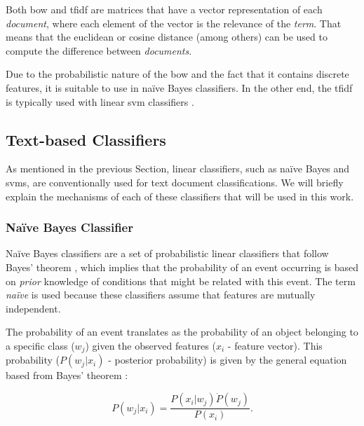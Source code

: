 Both \gls{bow} and \gls{tfidf} are matrices that have a vector representation of each \textit{document}, where each element of the vector is the relevance of the \textit{term}. That means that the euclidean or cosine distance (among others) can be used to compute the difference between \textit{documents}.
\par
Due to the probabilistic nature of the \gls{bow} and the fact that it contains discrete features, it is suitable to use in naïve Bayes classifiers. In the other end, the \gls{tfidf} is typically used with linear \gls{svm} classifiers \cite{scikit-learn}.

\subsection{Text-based Classifiers}
\label{subsec:text_classifiers}

As mentioned in the previous Section, linear classifiers, such as naïve Bayes and \gls{svm}s, are conventionally used for text document classifications. We will briefly explain the mechanisms of each of these classifiers that will be used in this work.

\subsubsection{Naïve Bayes Classifier}
\label{subsec:bayesian}

Naïve Bayes classifiers are a set of probabilistic linear classifiers that follow Bayes' theorem \cite{bayes_rule, NB_site}, which implies that the probability of an event occurring is based on \textit{prior} knowledge of conditions that might be related with this event. The term \textit{naïve} is used because these classifiers assume that features are mutually independent. 

The probability of an event translates as the probability of an object belonging to a specific class ($w_j$) given the observed features ($x_i$ - feature vector). This probability ($P(w_j|x_i)$ - posterior probability) is given by the general equation based from Bayes' theorem \cite{bayes_rule, NB, NB_site}:

\begin{equation}
P(w_j|x_i) = \frac{P(x_i|w_j) \dot P(w_j)}{P(x_i)}.
\end{equation}

